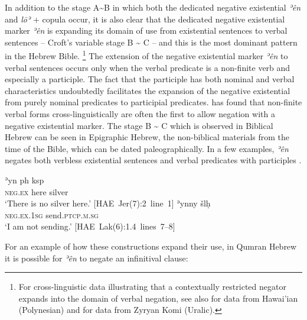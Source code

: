 \documentclass[output=paper,colorlinks,citecolor=brown,draft,draftmode]{langscibook}
\begin{document}
In addition to the stage A{\textasciitilde}B in which both the dedicated
negative existential \textit{ʾên} and \textit{lōʾ}  + copula occur, it is
also clear that the dedicated negative existential marker \textit{ʾên}  is
expanding its domain of use from existential sentences to verbal sentences
-- Croft's variable stage B {\textasciitilde} C -- and this is the most
dominant pattern in the Hebrew Bible.%
%
    \footnote{For cross-linguistic data illustrating that a contextually
    restricted negator expands into the domain of verbal negation, see also
    \textcite{Veselinova2014} for data from Hawai'ian (Polynesian) and
    \textcite{Veselinova2015} for data from Zyryan Komi (Uralic).}
%
The extension of the negative existential marker \textit{ʾên} to verbal
sentences occurs only when the verbal predicate is a non-finite verb and
especially a participle. The fact that the participle has both nominal and
verbal characteristics
\parencites{AndersenForbes2007}[33--35]{AndersenForbes2012}
undoubtedly facilitates the expansion of the negative existential from
purely nominal predicates to participial predicates.
\textcite[157]{Veselinova2016} has found that non-finite verbal forms
cross-linguistically are often the first to allow negation with a negative
existential marker. The stage B {\textasciitilde} C which is observed in
Biblical Hebrew can be seen in Epigraphic Hebrew, the non-biblical
materials from the time of the Bible, which can be dated paleographically.
In a few examples, \textit{ʾên} negates both verbless existential sentences
 and verbal predicates with participles
. 
%
\begin{exe}\ex \label{ex:heb-silver}
    \gll ʾyn   {\ob}p{\cb}h ksp\\
\textsc{neg.ex}  here    silver \\
    \glt `There is no silver here.' \mbox{[HAE Jer(7):2
    line 1]\footnotemark}
\ex \label{ex:heb-sending}
    \gll ʾyn{\ob}n{\cb}y šlḥ \\
\textsc{neg.ex.1sg}      send.\textsc{ptcp.m.sg} \\
    \glt `I am not sending.' \mbox{[HAE Lak(6):1.4
    lines 7--8]\footnotemark}
    \end{exe}
%
For an example of how these constructions expand their use, in Qumran Hebrew it is possible for \textit{ʾên} to negate an infinitival clause:
\end{document}
